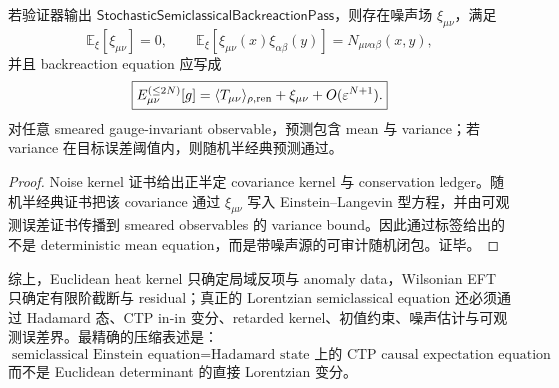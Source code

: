 \begin{theorem}[随机半经典闭包的可靠性]\label{thm:typed-address-biaxial-completion-stochastic-semiclassical-closure-soundness}
若验证器输出 \(\mathsf{StochasticSemiclassicalBackreactionPass}\)，则存在噪声场 \(\xi_{\mu\nu}\)，满足
\[
\mathbb E_\xi[\xi_{\mu\nu}]=0,
\qquad
\mathbb E_\xi[\xi_{\mu\nu}(x)\xi_{\alpha\beta}(y)]
=
N_{\mu\nu\alpha\beta}(x,y),
\]
并且 backreaction equation 应写成
\[
\boxed{
E_{\mu\nu}^{(\le2N)}[g]
=
\langle T_{\mu\nu}\rangle_{\rho,{\rm ren}}
+\xi_{\mu\nu}
+O(\varepsilon^{N+1}).
}
\]
对任意 smeared gauge-invariant observable，预测包含 mean 与 variance；若 variance 在目标误差阈值内，则随机半经典预测通过。
\end{theorem}
\begin{proof}
Noise kernel 证书给出正半定 covariance kernel 与 conservation ledger。随机半经典证书把该 covariance 通过 \(\xi_{\mu\nu}\) 写入 Einstein--Langevin 型方程，并由可观测误差证书传播到 smeared observables 的 variance bound。因此通过标签给出的不是 deterministic mean equation，而是带噪声源的可审计随机闭包。证毕。
\end{proof}

综上，Euclidean heat kernel 只确定局域反项与 anomaly data，Wilsonian EFT 只确定有限阶截断与 residual；真正的 Lorentzian semiclassical equation 还必须通过 Hadamard 态、CTP in-in 变分、retarded kernel、初值约束、噪声估计与可观测误差界。最精确的压缩表述是：
\[
\boxed{
\text{semiclassical Einstein equation}
=
\text{Hadamard state 上的 CTP causal expectation equation}
}
\]
而不是 Euclidean determinant 的直接 Lorentzian 变分。
